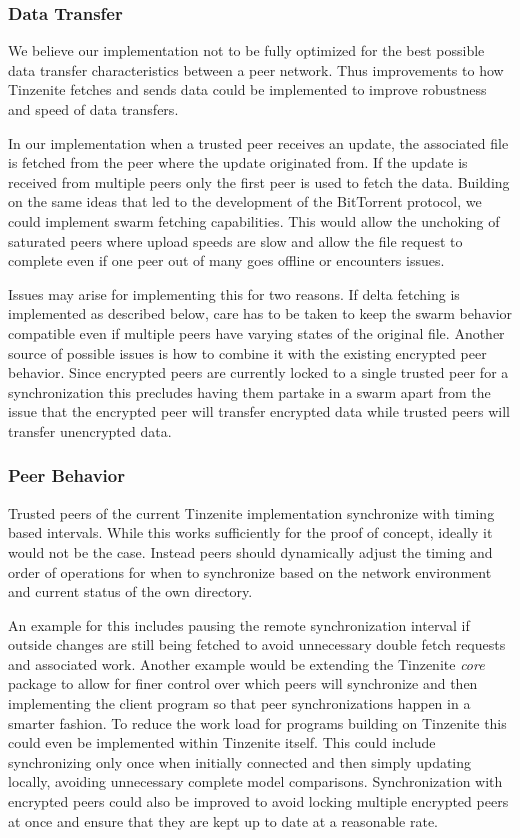 \subsubsection{Data Transfer}
\label{subs:Data Transfer}

We believe our implementation not to be fully optimized for the best possible data transfer characteristics between a peer network.
Thus improvements to how Tinzenite fetches and sends data could be implemented to improve robustness and speed of data transfers.

In our implementation when a trusted peer receives an update, the associated file is fetched from the peer where the update originated from.
If the update is received from multiple peers only the first peer is used to fetch the data.
Building on the same ideas that led to the development of the BitTorrent protocol, we could implement swarm fetching capabilities.
This would allow the unchoking of saturated peers where upload speeds are slow and allow the file request to complete even if one peer out of many goes offline or encounters issues.

Issues may arise for implementing this for two reasons.
If delta fetching is implemented as described below, care has to be taken to keep the swarm behavior compatible even if multiple peers have varying states of the original file.
Another source of possible issues is how to combine it with the existing encrypted peer behavior.
Since encrypted peers are currently locked to a single trusted peer for a synchronization this precludes having them partake in a swarm apart from the issue that the encrypted peer will transfer encrypted data while trusted peers will transfer unencrypted data.

\subsubsection{Peer Behavior}
\label{subs:Peer Behavior}

Trusted peers of the current Tinzenite implementation synchronize with timing based intervals.
While this works sufficiently for the proof of concept, ideally it would not be the case.
Instead peers should dynamically adjust the timing and order of operations for when to synchronize based on the network environment and current status of the own directory.

An example for this includes pausing the remote synchronization interval if outside changes are still being fetched to avoid unnecessary double fetch requests and associated work.
Another example would be extending the Tinzenite \emph{core} package to allow for finer control over which peers will synchronize and then implementing the client program so that peer synchronizations happen in a smarter fashion.
To reduce the work load for programs building on Tinzenite this could even be implemented within Tinzenite itself.
This could include synchronizing only once when initially connected and then simply updating locally, avoiding unnecessary complete model comparisons.
Synchronization with encrypted peers could also be improved to avoid locking multiple encrypted peers at once and ensure that they are kept up to date at a reasonable rate.

